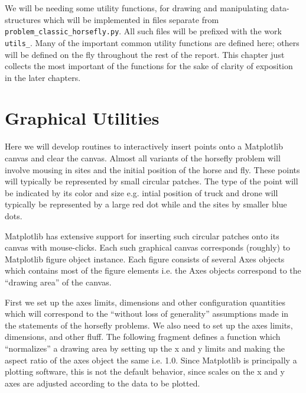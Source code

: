 \documentclass[11.5pt]{report}
\begin{document}
We will be needing some utility functions, for drawing and manipulating data-structures 
which will be implemented in files separate from \verb|problem_classic_horsefly.py|.  All such
files will be prefixed with the work \verb|utils_|. Many of the important common utility 
functions are defined here; others will be defined on the fly throughout the rest of the report. 
This chapter just collects the most important of the functions for the sake of clarity of exposition
in the later chapters. 

\section{Graphical Utilities}

Here we will  develop routines to interactively insert points onto a Matplotlib canvas and clear the canvas. 
Almost all variants of the horsefly problem will involve mousing in sites and the initial position of the horse 
and fly. These points will typically be represented by small circular patches. The type of the point
will be indicated by its color and size e.g. intial position of truck and drone 
will typically be represented by a large red dot while and the sites by smaller blue dots. 

Matplotlib has extensive support for inserting such circular patches onto its canvas with 
mouse-clicks. Each such graphical canvas corresponds (roughly) to Matplotlib figure
object instance. Each figure consists of several Axes objects which contains
most of the figure elements i.e. the Axes objects correspond to the ``drawing area''
of the canvas. 

\newchunk First we set up the axes limits, dimensions and other configuration quantities
which will correspond to the ``without loss of generality'' assumptions made in the 
statements of the horsefly problems. We also need to set up the axes limits,
dimensions, and other fluff. The following fragment defines a function which 
``normalizes'' a drawing area by setting up the x and y limits and making the 
aspect ratio of the axes object the same i.e. 1.0. Since Matplotlib is principally
a plotting software, this is not the default behavior, since scales on the x and y 
axes are adjusted according to the data to be plotted. 
\end{document}
